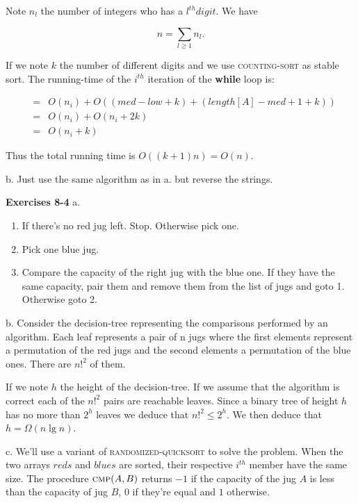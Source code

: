 \documentclass[a4paper,12pt]{article}
\newcommand{\newpar}[1]
{\bigskip \noindent \textbf{Exercises #1} \newline}
\newcommand{\subpar}[1]{\medskip \noindent #1.}
\begin{document}
Note $n_l$ the number of integers who has a $l^{th} digit$.  We have

\[ n = \sum_{l \ge 1} n_l.\]

If we note $k$ the number of different digits and we use
\textsc{counting-sort} as stable sort.  The running-time of the
$i^{th}$ iteration of the \textbf{while} loop is:

\begin{eqnarray*}
  &=& O(n_i) + O((med - low + k) + (length[A] - med + 1 + k)) \\
  &=& O(n_i) + O(n_i + 2k) \\
  &=& O(n_i + k)
\end{eqnarray*}

Thus the total running time is $O((k+1)n) = O(n)$.

\subpar{b} Just use the same algorithm as in a. but reverse the
strings.

\newpar{8-4}
\subpar{a}

\begin{enumerate}

\item If there's no red jug left. Stop. Otherwise pick one.

\item Pick one blue jug.

\item Compare the capacity of the right jug with the blue one.  If
  they have the same capacity, pair them and remove them from the list
  of jugs and goto 1.  Otherwise goto 2.
\end{enumerate}

\subpar{b} Consider the decision-tree representing the comparisons
performed by an algorithm.  Each leaf represents a pair of n jugs
where the first elements represent a permutation of the red jugs and the
second elements a permutation of the blue ones.  There are $n!^2$
of them.

If we note $h$ the height of the decision-tree.  If we assume that the
algorithm is correct each of the $n!^2$ pairs are reachable leaves.
Since a binary tree of height $h$ has no more than $2^h$ leaves we
deduce that $n!^2 \le 2^h$.  We then deduce that $h = \Omega(n \lg
n)$.

\subpar{c} We'll use a variant of \textsc{randomized-quicksort} to
solve the problem.  When the two arrays $reds$ and $blues$ are sorted,
their respective $i^{th}$ member have the same size.  The procedure
$\textsc{cmp}(A, B)$ returns $-1$ if the capacity of the jug $A$ is less
than the capacity of jug $B$, $0$ if they're equal and $1$ otherwise.
\end{document}
